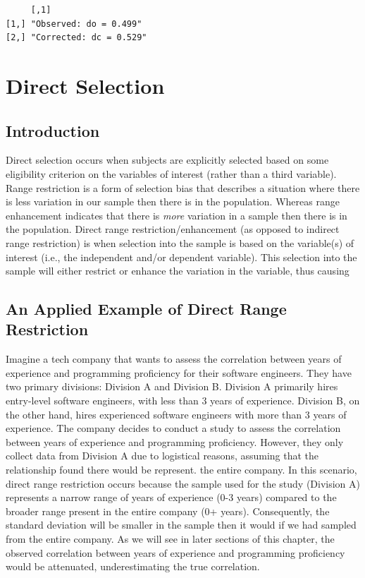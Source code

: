 \documentclass[
  letterpaper,
  DIV=11,
  numbers=noendperiod]{scrreprt}
\begin{document}
\begin{verbatim}
     [,1]                   
[1,] "Observed: do = 0.499" 
[2,] "Corrected: dc = 0.529"
\end{verbatim}

\hypertarget{sec-direct_range_restriction}{%
\chapter{Direct Selection}\label{sec-direct_range_restriction}}

\hypertarget{introduction-5}{%
\section{Introduction}\label{introduction-5}}

Direct selection occurs when subjects are explicitly selected based on
some eligibility criterion on the variables of interest (rather than a
third variable). Range restriction is a form of selection bias that
describes a situation where there is less variation in our sample then
there is in the population. Whereas range enhancement indicates that
there is \emph{more} variation in a sample then there is in the
population. Direct range restriction/enhancement (as opposed to indirect
range restriction) is when selection into the sample is based on the
variable(s) of interest (i.e., the independent and/or dependent
variable). This selection into the sample will either restrict or
enhance the variation in the variable, thus causing

\hypertarget{an-applied-example-of-direct-range-restriction}{%
\section{An Applied Example of Direct Range
Restriction}\label{an-applied-example-of-direct-range-restriction}}

Imagine a tech company that wants to assess the correlation between
years of experience and programming proficiency for their software
engineers. They have two primary divisions: Division A and Division B.
Division A primarily hires entry-level software engineers, with less
than 3 years of experience. Division B, on the other hand, hires
experienced software engineers with more than 3 years of experience. The
company decides to conduct a study to assess the correlation between
years of experience and programming proficiency. However, they only
collect data from Division A due to logistical reasons, assuming that
the relationship found there would be represent. the entire company. In
this scenario, direct range restriction occurs because the sample used
for the study (Division A) represents a narrow range of years of
experience (0-3 years) compared to the broader range present in the
entire company (0+ years). Consequently, the standard deviation will be
smaller in the sample then it would if we had sampled from the entire
company. As we will see in later sections of this chapter, the observed
correlation between years of experience and programming proficiency
would be attenuated, underestimating the true correlation.
\end{document}

